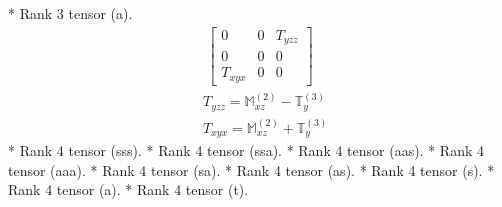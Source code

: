 \documentclass[fleqn,8pt,landscape]{jsarticle}
\begin{document}
* Rank 3 tensor (a).
\begin{align*}
\begin{bmatrix} 0 & 0 & T_{yzz} \\ 0 & 0 & 0 \\ T_{xyx} & 0 & 0 \end{bmatrix}
\end{align*}
\begin{align*}
& T_{yzz} = \mathbb{M}_{xz}^{(2)} - \mathbb{T}_{y}^{(3)} \\
& T_{xyx} = \mathbb{M}_{xz}^{(2)} + \mathbb{T}_{y}^{(3)}
\end{align*}
* Rank 4 tensor (sss).
* Rank 4 tensor (ssa).
* Rank 4 tensor (aas).
* Rank 4 tensor (aaa).
* Rank 4 tensor (sa).
* Rank 4 tensor (as).
* Rank 4 tensor (s).
* Rank 4 tensor (a).
* Rank 4 tensor (t).
\end{document}

